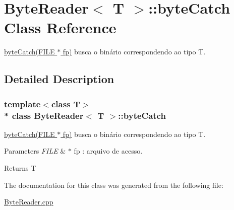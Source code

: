 \hypertarget{class_byte_reader_1_1byte_catch}{}\section{Byte\+Reader$<$ T $>$\+:\+:byte\+Catch Class Reference}
\label{class_byte_reader_1_1byte_catch}


\hyperlink{class_byte_reader_ae570748805994596f51ae033183935d7}{byte\+Catch(\+F\+I\+L\+E $\ast$ fp)} busca o binário correspondendo ao tipo T.  




\subsection{Detailed Description}
\subsubsection*{template$<$class T$>$\\*
class Byte\+Reader$<$ T $>$\+::byte\+Catch}

\hyperlink{class_byte_reader_ae570748805994596f51ae033183935d7}{byte\+Catch(\+F\+I\+L\+E $\ast$ fp)} busca o binário correspondendo ao tipo T. 


\begin{DoxyParams}{Parameters}
{\em F\+I\+LE} & $\ast$ fp \+: arquivo de acesso. \\
\hline
\end{DoxyParams}
\begin{DoxyReturn}{Returns}
T 
\end{DoxyReturn}


The documentation for this class was generated from the following file\+:\begin{DoxyCompactItemize}
\item 
\hyperlink{_byte_reader_8cpp}{Byte\+Reader.\+cpp}\end{DoxyCompactItemize}
